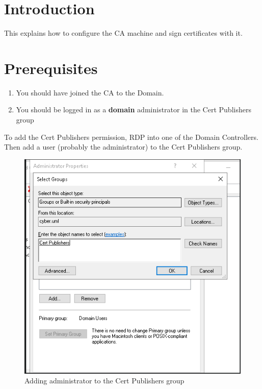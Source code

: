 \documentclass{article}
\begin{document}
\graphicspath{ {./Images/} }
\tableofcontents

\section{Introduction}
This explains how to configure the CA machine and sign certificates with it.

\section{Prerequisites}
\begin {enumerate}
\item You should have joined the CA to the Domain.
\item You should be logged in as a \textbf{domain} administrator in the Cert Publishers group
\end {enumerate}

To add the Cert Publishers permission, RDP into one of the Domain Controllers.
Then add a user (probably the administrator) to the Cert Publishers group.

\begin{figure}[H]
        \centering
        \includegraphics[width=1\textwidth]{AddingCertPublisherPermission.png}
        \caption{Adding administrator to the Cert Publishers group}
        \label{fig:AddingCertPublisherPermission}
\end{figure}
\end{document}

